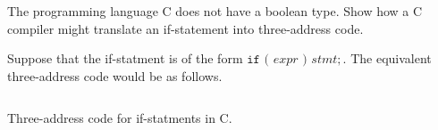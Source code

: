 \begin{exercise}\label{ex:020802}
    The programming language C does not have a boolean type. Show how a C 
    compiler might translate an if-statement into three-address code.
\end{exercise}
\begin{solution}\label{sol:020802}
    Suppose that the if-statment is of the form $\texttt{if ( } expr 
    \texttt{ ) } stmt;$. The equivalent three-address code would be as follows.
    \begin{listing}
        \inputminted[linenos=true, frame=single, breaklines=true]{java}{02/08/02/ex020802.java}
        \caption{Three-address code for if-statments in C.}
        \label{code:020802}
    \end{listing}
\end{solution}